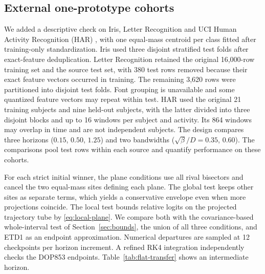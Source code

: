 \subsection{External one-prototype cohorts}

We added a descriptive check on Iris, Letter Recognition and
UCI Human Activity Recognition (HAR) \cite{iris,letter,har},
with one equal-mass centroid per class fitted after training-only
standardization. Iris used three disjoint stratified test folds
after exact-feature deduplication. Letter Recognition retained the
original 16,000-row training set and the source test set, with 380
test rows removed because their exact feature vectors occurred in
training. The remaining 3,620 rows were partitioned into disjoint
test folds. Font grouping is unavailable and some quantized feature
vectors may repeat within test. HAR used the original 21 training
subjects and nine held-out subjects, with the latter divided into
three disjoint blocks and up to 16 windows per subject and activity.
Its 864 windows may overlap in time and are not independent subjects.
The design compares three horizons ($0.15$, $0.50$, $1.25$) and two
bandwidths ($\sqrt{\beta}/D=0.35$, $0.60$). The comparisons pool
test rows within each source and quantify performance on these
cohorts.

For each strict initial winner, the plane conditions use all rival
bisectors and cancel the two equal-mass sites defining each plane.
The global test keeps other sites as separate terms, which yields a
conservative envelope even when more projections coincide. The local
test bounds relative logits on the projected trajectory tube by
\eqref{eq:local-plane}. We compare both with the covariance-based
whole-interval test of Section~\ref{sec:bounds}, the union of all
three conditions, and ETD1 as an endpoint
approximation. Numerical departures are sampled at 12 checkpoints
per horizon increment. A refined RK4 integration independently checks
the DOP853 endpoints. Table~\ref{tab:flat-transfer} shows an
intermediate horizon.

